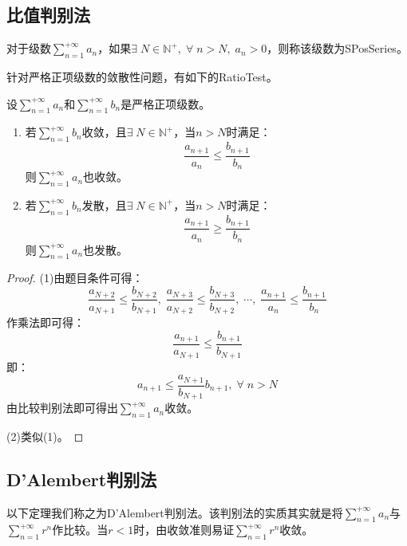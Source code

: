 \subsection{比值判别法}
\begin{definition}
	对于级数$\sum\limits_{n=1}^{+\infty}a_n$，如果$\exists\;N\in\mathbb{N}^+,\;\forall\;n>N,\;a_n>0$，则称该级数为\gls{SPosSeries}。
\end{definition}
针对严格正项级数的敛散性问题，有如下的\gls{RatioTest}。
\begin{theorem}
	设$\sum\limits_{n=1}^{+\infty}a_n$和$\sum\limits_{n=1}^{+\infty}b_n$是严格正项级数。
	\begin{enumerate}
		\item 若$\sum\limits_{n=1}^{+\infty}b_n$收敛，且$\exists\;N\in\mathbb{N}^+$，当$n>N$时满足：
		\begin{equation*}
			\frac{a_{n+1}}{a_n}\leqslant\frac{b_{n+1}}{b_n}
		\end{equation*}
		则$\sum\limits_{n=1}^{+\infty}a_n$也收敛。
		\item 若$\sum\limits_{n=1}^{+\infty}b_n$发散，且$\exists\;N\in\mathbb{N}^+$，当$n>N$时满足：
		\begin{equation*}
			\frac{a_{n+1}}{a_n}\geqslant\frac{b_{n+1}}{b_n}
		\end{equation*}
		则$\sum\limits_{n=1}^{+\infty}a_n$也发散。
	\end{enumerate}
\end{theorem}
\begin{proof}
	(1)由题目条件可得：
	\begin{equation*}
		\frac{a_{N+2}}{a_{N+1}}\leqslant\frac{b_{N+2}}{b_{N+1}},\;
		\frac{a_{N+3}}{a_{N+2}}\leqslant\frac{b_{N+3}}{b_{N+2}},\;
		\cdots,\;
		\frac{a_{n+1}}{a_n}\leqslant\frac{b_{n+1}}{b_n}
	\end{equation*}
	作乘法即可得：
	\begin{equation*}
		\frac{a_{n+1}}{a_{N+1}}\leqslant\frac{b_{n+1}}{b_{N+1}}
	\end{equation*}
	即：
	\begin{equation*}
		a_{n+1}\leqslant\frac{a_{N+1}}{b_{N+1}}b_{n+1},\;\forall\;n>N
	\end{equation*}
	由比较判别法即可得出$\sum\limits_{n=1}^{+\infty}a_n$收敛。\par
	(2)类似(1)。
\end{proof}

\subsection{D'Alembert判别法}
以下定理我们称之为D'Alembert判别法。该判别法的实质其实就是将$\sum\limits_{n=1}^{+\infty}a_n$与$\sum\limits_{n=1}^{+\infty}r^n$作比较。当$r<1$时，由收敛准则易证$\sum\limits_{n=1}^{+\infty}r^n$收敛。
